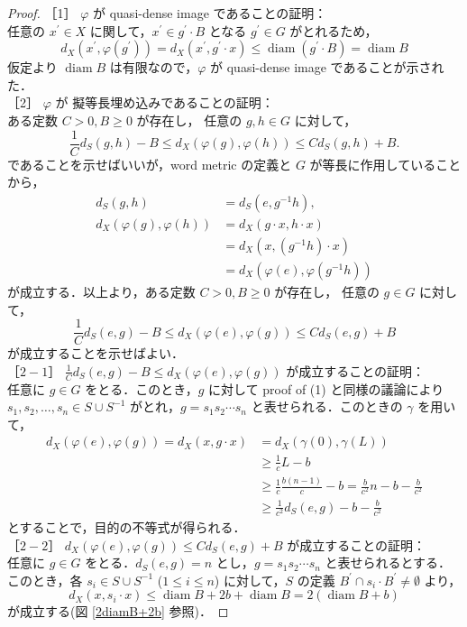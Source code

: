 \documentclass[dvipdfmx]{ujarticle}
\DeclareMathOperator{\diam}{diam}
\theoremstyle{definition}
\begin{document}
\begin{proof}
\noindent
［1］ $\varphi$ が quasi-dense image であることの証明：\\
任意の $x^\prime \in X$ に関して，$x^\prime\in g^\prime\cdot B$ となる $g^\prime \in G$ がとれるため，
$$d_X(x^\prime,\varphi(g^\prime))=d_X(x^\prime,g^\prime\cdot x)\leq \diam (g^\prime \cdot B)=\diam B$$
仮定より $\diam B$ は有限なので，$\varphi$ が quasi-dense image であることが示された．\\

\noindent
［2］ $\varphi$ が 擬等長埋め込みであることの証明：\\
ある定数 $C>0,B\geq0$ が存在し， 任意の $g,h\in G$ に対して，
$$\frac{1}{C}d_S(g,h)-B\leq d_X(\varphi(g),\varphi(h))\leq Cd_S(g,h)+B.$$
であることを示せばいいが，word metric の定義と $G$ が等長に作用していることから，
\begin{align*}
  d_S(g,h)&=d_S(e,g^{-1}h),\\
  d_X(\varphi(g),\varphi(h))&=d_X(g\cdot x,h\cdot x)\\
  &=d_X(x,(g^{-1}h)\cdot x)\\
  &=d_X(\varphi(e),\varphi(g^{-1}h))
\end{align*}
が成立する．以上より，ある定数 $C>0,B\geq 0$ が存在し， 任意の $g\in G$ に対して，
$$\frac{1}{C}d_S(e,g)-B\leq d_X(\varphi(e),\varphi(g))\leq Cd_S(e,g)+B$$
が成立することを示せばよい．\\

\noindent
［$2-1$］ $\frac{1}{C}d_S(e,g)-B\leq d_X(\varphi(e),\varphi(g))$ が成立することの証明：\\
 任意に $g\in G$ をとる．このとき，$g$ に対して proof of (1) と同様の議論により $s_1,s_2,\ldots ,s_n\in S\cup S^{-1}$ がとれ，$g=s_1s_2\cdots s_n$ と表せられる．このときの $\gamma$ を用いて，
\begin{align*}
  d_X(\varphi(e),\varphi(g))=d_X(x,g\cdot x)&=d_X(\gamma(0),\gamma(L))\\
  &\geq \frac{1}{c}L-b\\
  &\geq \frac{1}{c}\frac{b(n-1)}{c}-b=\frac{b}{c^2}n-b-\frac{b}{c^2}\\
  &\geq \frac{1}{c^2}d_S(e,g)-b-\frac{b}{c^2}
\end{align*}
とすることで，目的の不等式が得られる．\\

\noindent
［$2-2$］ $d_X(\varphi(e),\varphi(g))\leq Cd_S(e,g)+B$ が成立することの証明：\\
任意に $g\in G$ をとる．$d_S(e,g)=n$ とし，$g=s_1s_2\cdots s_n$ と表せられるとする．このとき，各 $s_i\in S\cup S^{-1}$ ($1\leq i\leq n$) に対して，$S$ の定義 $B^\prime\cap s_i\cdot B^\prime\neq\emptyset$ より，
$$d_X(x,s_i\cdot x)\leq \diam B+2b+\diam B=2(\diam B+b)$$
が成立する(図 \ref{2diamB+2b} 参照)．


\end{proof}
\end{document}
